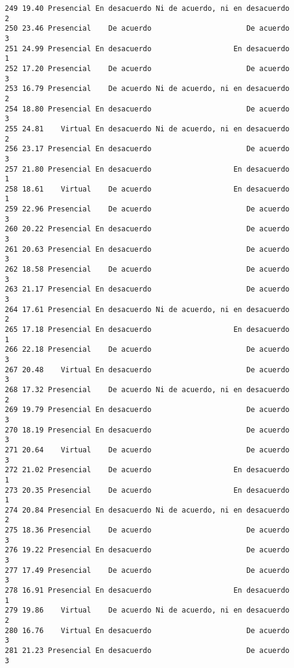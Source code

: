 \documentclass[
  letterpaper,
  DIV=11,
  numbers=noendperiod]{scrartcl}
\begin{document}
\begin{verbatim}
249 19.40 Presencial En desacuerdo Ni de acuerdo, ni en desacuerdo           2
250 23.46 Presencial    De acuerdo                      De acuerdo           3
251 24.99 Presencial En desacuerdo                   En desacuerdo           1
252 17.20 Presencial    De acuerdo                      De acuerdo           3
253 16.79 Presencial    De acuerdo Ni de acuerdo, ni en desacuerdo           2
254 18.80 Presencial En desacuerdo                      De acuerdo           3
255 24.81    Virtual En desacuerdo Ni de acuerdo, ni en desacuerdo           2
256 23.17 Presencial En desacuerdo                      De acuerdo           3
257 21.80 Presencial En desacuerdo                   En desacuerdo           1
258 18.61    Virtual    De acuerdo                   En desacuerdo           1
259 22.96 Presencial    De acuerdo                      De acuerdo           3
260 20.22 Presencial En desacuerdo                      De acuerdo           3
261 20.63 Presencial En desacuerdo                      De acuerdo           3
262 18.58 Presencial    De acuerdo                      De acuerdo           3
263 21.17 Presencial En desacuerdo                      De acuerdo           3
264 17.61 Presencial En desacuerdo Ni de acuerdo, ni en desacuerdo           2
265 17.18 Presencial En desacuerdo                   En desacuerdo           1
266 22.18 Presencial    De acuerdo                      De acuerdo           3
267 20.48    Virtual En desacuerdo                      De acuerdo           3
268 17.32 Presencial    De acuerdo Ni de acuerdo, ni en desacuerdo           2
269 19.79 Presencial En desacuerdo                      De acuerdo           3
270 18.19 Presencial En desacuerdo                      De acuerdo           3
271 20.64    Virtual    De acuerdo                      De acuerdo           3
272 21.02 Presencial    De acuerdo                   En desacuerdo           1
273 20.35 Presencial    De acuerdo                   En desacuerdo           1
274 20.84 Presencial En desacuerdo Ni de acuerdo, ni en desacuerdo           2
275 18.36 Presencial    De acuerdo                      De acuerdo           3
276 19.22 Presencial En desacuerdo                      De acuerdo           3
277 17.49 Presencial    De acuerdo                      De acuerdo           3
278 16.91 Presencial En desacuerdo                   En desacuerdo           1
279 19.86    Virtual    De acuerdo Ni de acuerdo, ni en desacuerdo           2
280 16.76    Virtual En desacuerdo                      De acuerdo           3
281 21.23 Presencial En desacuerdo                      De acuerdo           3

\end{verbatim}
\end{document}
